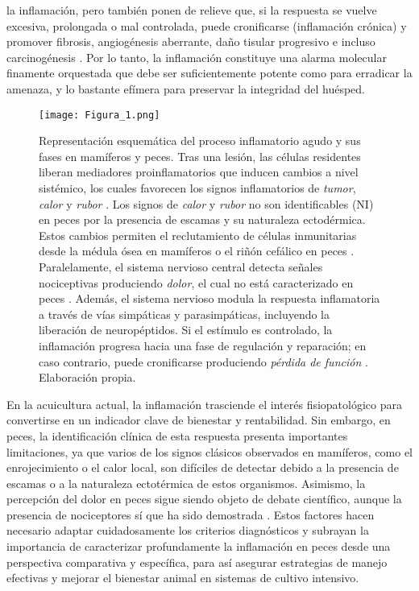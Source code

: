 \documentclass[10pt,a4paper]{article}
\begin{document}
la inflamación, pero también ponen de relieve que, si la respuesta se vuelve excesiva, prolongada o mal controlada, puede cronificarse (inflamación crónica) y promover fibrosis, angiogénesis aberrante, daño tisular progresivo e incluso carcinogénesis \parencite{Nathan2010}. Por lo tanto, la inflamación constituye una alarma molecular finamente orquestada que debe ser suficientemente potente como para erradicar la amenaza, y lo bastante efímera para preservar la integridad del huésped.

\begin{figure}[ht]
  \centering
    \texttt{[image: Figura\_1.png]} 

  \caption{Representación esquemática del proceso inflamatorio agudo y sus fases en mamíferos y peces. Tras una lesión, las células residentes liberan mediadores proinflamatorios que inducen cambios a nivel sistémico, los cuales favorecen los signos inflamatorios de \emph{tumor}, \emph{calor} y \emph{rubor} \parencite{Bordes1994}. Los signos de \emph{calor} y \emph{rubor} no son identificables (NI) en peces por la presencia de escamas y su naturaleza ectodérmica. Estos cambios permiten el reclutamiento de células inmunitarias desde la médula ósea en mamíferos o el riñón cefálico en peces \parencite{Kolaczkowska2013}. Paralelamente, el sistema nervioso central detecta señales nociceptivas produciendo  \emph{dolor}, el cual no está caracterizado en peces \parencite{Kelly2022}. Además, el sistema nervioso modula la respuesta inflamatoria a través de vías simpáticas y parasimpáticas, incluyendo la liberación de neuropéptidos. Si el estímulo es controlado, la inflamación progresa hacia una fase de regulación y reparación; en caso contrario, puede cronificarse produciendo \emph{pérdida de función} \parencite{Nathan2010}. Elaboración propia.}
  \label{fig:1}
\end{figure}

En la acuicultura actual, la inflamación trasciende el interés fisiopatológico para convertirse en un indicador clave de bienestar y rentabilidad. Sin embargo, en peces, la identificación clínica de esta respuesta presenta importantes limitaciones, ya que varios de los signos clásicos observados en mamíferos, como el enrojecimiento o el calor local, son difíciles de detectar debido a la presencia de escamas o a la naturaleza ectotérmica de estos organismos. Asimismo, la percepción del dolor en peces sigue siendo objeto de debate científico, aunque la presencia de nociceptores sí que ha sido demostrada \parencite{Sneddon2015,Sneddon2003}. Estos factores hacen necesario adaptar cuidadosamente los criterios diagnósticos y subrayan la importancia de caracterizar profundamente la inflamación en peces desde una perspectiva comparativa y específica, para así asegurar estrategias de manejo efectivas y mejorar el bienestar animal en sistemas de cultivo intensivo.
\end{document}
